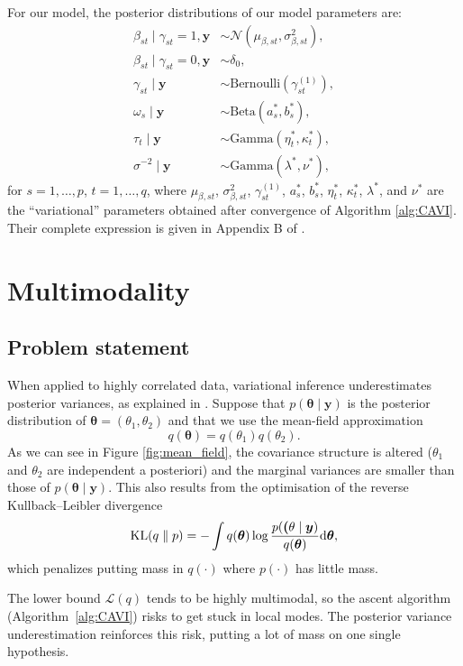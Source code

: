 \documentclass[a4paper, 11pt]{report}
\numberwithin{equation}{chapter}
\DeclareMathOperator*{\KL}{{\rm KL}}
\begin{document}
For our model, the posterior distributions of our model parameters are:
\begin{align*}
\beta_{st} \mid \gamma_{st} = 1, \boldsymbol{y} &\sim \mathcal{N}\left(\mu_{\beta, st},\sigma^2_{\beta, st}\right),\\
\beta_{st} \mid \gamma_{st} = 0, \boldsymbol{y} &\sim \delta_0,\\
\gamma_{st} \mid \boldsymbol{y} &\sim \text{Bernoulli}(\gamma_{st}^{(1)}),\\
\omega_s\mid\boldsymbol{y} &\sim \text{Beta}(a_s^*,b_s^*),\\
\tau_t\mid \boldsymbol{y} &\sim \text{Gamma}(\eta^*_t, \kappa^*_t),\\
\sigma^{-2} \mid \boldsymbol{y} &\sim \text{Gamma}(\lambda^*, \nu^*),
\end{align*}
for $s=1,\dots,p$, $t=1,\dots,q$, where $\mu_{\beta,st}$, $\sigma^2_{\beta,st}$, $\gamma_{st}^{(1)}$, $a_s^*$, $b_s^*$, $\eta_t^*$, $\kappa_t^*$, $\lambda^*$, and $\nu^*$ are the ``variational'' parameters obtained after convergence of Algorithm \ref{alg:CAVI}. Their complete expression is given in Appendix B of \citet{helen}.

\newpage
\chapter{Multimodality}
\section{Problem statement} \label{sec:pro_stat}
When applied to highly correlated data, variational inference underestimates posterior variances, as explained in \citet{varInf}. Suppose that $p(\boldsymbol{\theta} \mid \boldsymbol{y})$ is the posterior distribution of $\boldsymbol{\theta} = (\theta_1,\theta_2)$ and that we use the mean-field approximation $$
q(\boldsymbol{\theta}) = q(\theta_1)q(\theta_2).
$$
As we can see in Figure \ref{fig:mean_field}, the covariance structure is altered ($\theta_1$ and $\theta_2$ are independent a posteriori) and the marginal variances are smaller than those of $p(\boldsymbol{\theta} \mid \boldsymbol{y})$. This also results from the optimisation of the reverse Kullback--Leibler divergence
$$
\KL (q\parallel p) = - \int q(\boldsymbol{\theta})\log\frac{p(\boldsymbol(\theta\mid\boldsymbol{y})}{q(\boldsymbol{\theta})}\mathrm{d}\boldsymbol{\theta},
$$
which penalizes putting mass in $q(\cdot)$ where $p(\cdot)$ has little mass.

The lower bound $\mathcal{L}(q)$ tends to be highly multimodal, so the ascent algorithm (Algorithm~\ref{alg:CAVI}) risks to get stuck in local modes. The posterior variance underestimation reinforces this risk, putting a lot of mass on one single hypothesis.
\end{document}
